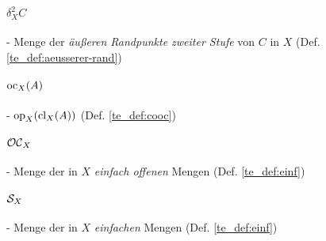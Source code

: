     \paragraph{$\delta_X^2 C$} - \quad Menge der \textit{äußeren Randpunkte zweiter Stufe} von $C$ in $X$ (Def. \ref{te_def:aeusserer-rand})

    \paragraph{$\text{oc}_X(A)$} - \quad $\text{op}_X(\text{cl}_X(A))$ (Def. \ref{te_def:cooc})

    \paragraph{$\mathcal{OC}_X$} - \quad Menge der in $X$ \textit{einfach offenen} Mengen (Def. \ref{te_def:einf})

    \paragraph{$\mathcal{S}_X$} - \quad Menge der in $X$ \textit{einfachen} Mengen (Def. \ref{te_def:einf})


